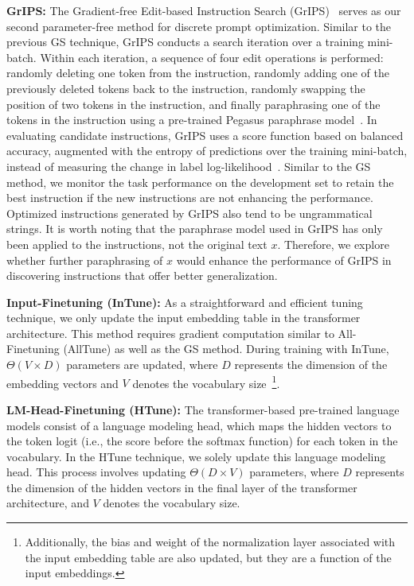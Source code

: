 \documentclass[11pt]{article}
\begin{document}
\textbf{GrIPS:} The Gradient-free Edit-based Instruction Search (GrIPS)~\cite{prasad-etal-2023-grips} serves as our second parameter-free method for discrete prompt optimization. Similar to the previous GS technique, GrIPS conducts a search iteration over a training mini-batch. Within each iteration, a sequence of four edit operations is performed: randomly deleting one token from the instruction, randomly adding one of the previously deleted tokens back to the instruction, randomly swapping the position of two tokens in the instruction, and finally paraphrasing one of the tokens in the instruction using a pre-trained Pegasus paraphrase model~\cite{pmlr-v119-zhang20ae}. In evaluating candidate instructions, GrIPS uses a score function based on balanced accuracy, augmented with the entropy of predictions over the training mini-batch, instead of measuring the change in label log-likelihood~\cite{prasad-etal-2023-grips}. Similar to the GS method, we monitor the task performance on the development set to retain the best instruction if the new instructions are not enhancing the performance. Optimized instructions generated by GrIPS also tend to be ungrammatical strings. It is worth noting that the paraphrase model used in GrIPS has only been applied to the instructions, not the original text $x$. Therefore, we explore whether further paraphrasing of $x$ would enhance the performance of GrIPS in discovering instructions that offer better generalization.

\textbf{Input-Finetuning (InTune):} As a straightforward and efficient tuning technique, we only update the input embedding table in the transformer architecture. This method requires gradient computation similar to All-Finetuning (AllTune) as well as the GS method. During training with InTune, $\Theta(V \times D)$ parameters are updated, where $D$ represents the dimension of the embedding vectors and $V$ denotes the vocabulary size~\footnote{Additionally, the bias and weight of the normalization layer associated with the input embedding table are also updated, but they are a function of the input embeddings.}.

\textbf{LM-Head-Finetuning (HTune):} The transformer-based pre-trained language models consist of a language modeling head, which maps the hidden vectors to the token logit (i.e., the score before the softmax function) for each token in the vocabulary. In the HTune technique, we solely update this language modeling head. This process involves updating $\Theta(D \times V)$ parameters, where $D$ represents the dimension of the hidden vectors in the final layer of the transformer architecture, and $V$ denotes the vocabulary size.
\end{document}
